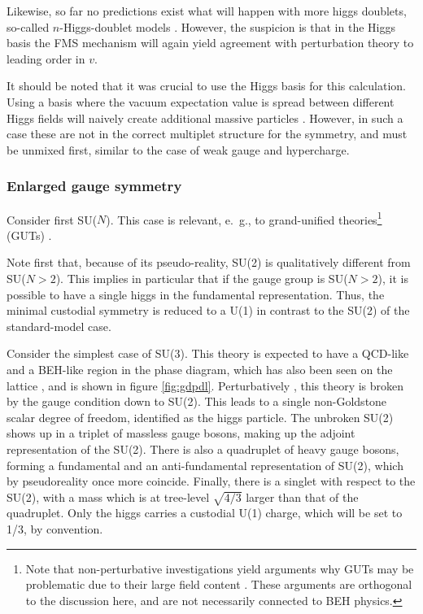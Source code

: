 \documentclass[final,12pt]{article}
\newcommand*{\1}{1\!\!\!\bot}
\begin{document}
Likewise, so far no predictions exist what will happen with more higgs doublets, so-called $n$-Higgs-doublet models \cite{Ivanov:2017dad}. However, the suspicion is that in the Higgs basis the FMS mechanism will again yield agreement with perturbation theory to leading order in $v$.

It should be noted that it was crucial to use the Higgs basis for this calculation. Using a basis where the vacuum expectation value is spread between different Higgs fields will naively create additional massive particles \cite{Maas:2015gma}. However, in such a case these are not in the correct multiplet structure for the symmetry, and must be unmixed first, similar to the case of weak gauge and hypercharge.

\subsubsection{Enlarged gauge symmetry}\label{sss:gut}

Consider first SU($N$). This case is relevant, e.\ g., to grand-unified theories\footnote{Note that non-perturbative investigations yield arguments why GUTs may be problematic due to their large field content \cite{Llanes-Estrada:2017zws,Shaposhnikov:2009pv,Dona:2013qba,Eichhorn:2016esv,Litim:2011qf}. These arguments are orthogonal to the discussion here, and are not necessarily connected to BEH physics.} (GUTs) \cite{Bohm:2001yx,Langacker:1980js}.

Note first that, because of its pseudo-reality, SU(2) is qualitatively different from SU($N>2$). This implies in particular that if the gauge group is SU($N>2$), it is possible to have a single higgs in the fundamental representation. Thus, the minimal custodial symmetry is reduced to a U(1) in contrast to the SU(2) of the standard-model case.

Consider the simplest case of SU(3). This theory is expected to have a QCD-like and a BEH-like region in the phase diagram, which has also been seen on the lattice \cite{Maas:2016ngo}, and is shown in figure \ref{fig:gdpdl}. Perturbatively \cite{Bohm:2001yx,Maas:2016ngo}, this theory is broken by the gauge condition down to SU(2). This leads to a single non-Goldstone scalar degree of freedom, identified as the higgs particle. The unbroken SU(2) shows up in a triplet of massless gauge bosons, making up the adjoint representation of the SU(2). There is also a quadruplet of heavy gauge bosons, forming a fundamental and an anti-fundamental representation of SU(2), which by pseudoreality once more coincide. Finally, there is a singlet with respect to the SU(2), with a mass which is at tree-level $\sqrt{4/3}$ larger than that of the quadruplet. Only the higgs carries a custodial U(1) charge, which will be set to 1/3, by convention.
\end{document}
